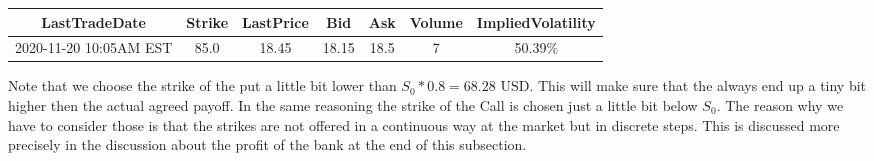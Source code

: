\documentclass[11pt,oneside,a4paper]{article}
\begin{document}
	\begin{tabular}{|c|c|c|c|c|c|c|}
		\hline\textbf{{LastTradeDate}} & \textbf{Strike} & \textbf{LastPrice} & \textbf{Bid} & \textbf{Ask} & \textbf{Volume} & \textbf{ImpliedVolatility}\\\hline
		2020-11-20 10:05AM EST & 85.0 & 18.45 & 18.15 & 18.5 & 7 & 50.39\%
		\\\hline
	\end{tabular}
	
	Note that we choose the strike of the put a little bit lower than $ S_0*0.8 = 68.28 \text{ USD} $. This will make sure that the always end up a tiny bit higher then the actual agreed  
	payoff. In the same reasoning the strike of the Call is chosen just a little bit below $ S_0 $. The reason why we have to consider those is that the strikes are not offered in a continuous way at the market but in discrete steps. This is discussed more precisely in the discussion about the profit of the bank at the end of this subsection.
	
\end{document}
